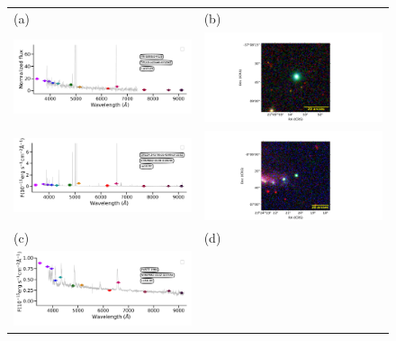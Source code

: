 \documentclass[fleqn,usenatbib]{mnras}
\begin{document}
\begin{figure}
  \setlength\tabcolsep{0pt}
  \begin{tabular}{ll}
    (a) & (b) \\
    \includegraphics[trim=10 0 10 20, clip]{Figs/StenholmAcker_pn_g006_0-41_9_id176-SPLUS-s29s46-072842.pdf}
    & \includegraphics[width=0.4\linewidth, trim=10 0 10 20, clip]{Figs/PNG006_316-37_100_r.pdf} \\
    \includegraphics[trim=10 0 10 20, clip]{Figs/spec-0680-52200-0153-STRIPE82-0159-019049.pdf}
    & \includegraphics[width=0.4\linewidth, trim=10 0 10 20, clip]{Figs/GALEX24170_351-0_150_r.pdf} \\
    (c) & (d) \\
    \includegraphics[trim=10 0 10 20, clip]{Figs/spec-0376-52143-0631-STRIPE82-0142-027354.pdf}

\end{tabular}
\end{figure}
\end{document}
